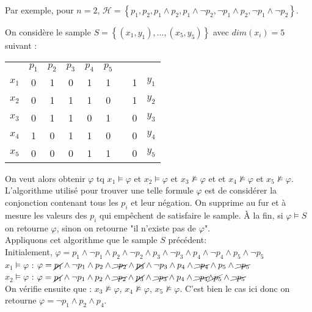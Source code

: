 \documentclass{article}
\begin{document}
    Par exemple, pour $n=2$, $\mathcal{H} = \left\{p_1, p_2, p_1 \wedge p_2,
    p_1 \wedge \neg p_2, \neg p_1 \wedge p_2, \neg p_1 \wedge \neg p_2 \right\}$.

    On considère le sample $S = \left\{(x_1,y_1),\dots,(x_5,y_5) \right\}$ avec
    $dim(x_i)=5$ suivant :

    \begin{center}
        \begin{tabular}{c c c c c c c c c}
        & $p_1$ & $p_2$ & $p_3$ & $p_4$ & $p_5$ &&&\\
        $x_1$ & 0 & 1 & 0 & 1 & 1 && 1 & $y_1$ \\
        $x_2$ & 0 & 1 & 1 & 1 & 0 && 1 & $y_2$ \\
        $x_3$ & 0 & 1 & 1 & 0 & 1 && 0 & $y_3$ \\
        $x_4$ & 1 & 0 & 1 & 1 & 0 && 0 & $y_4$ \\
        $x_5$ & 0 & 0 & 0 & 1 & 1 && 0 & $y_5$ \\
        \end{tabular}
    \end{center}

    On veut alors obtenir $\varphi$ tq $x_1 \models \varphi$ et $x_2 \models \varphi$ et $x_3 \not\models \varphi$ et et $x_4 \not\models \varphi$ et $x_5 \not\models \varphi$. L'algorithme utilisé pour trouver une telle formule
    $\varphi$ est de considérer la conjonction contenant tous les $p_i$ et
    leur négation. On supprime au fur et à mesure les valeurs des $p_i$ qui
    empêchent de satisfaire le sample. \`A la fin, si $\varphi \models S$ on
    retourne $\varphi$, sinon on retourne "il n'existe pas de $\varphi$".
    \\

    Appliquons cet algorithme que le sample $S$ précédent: \\
    Initialement, $\varphi = p_1 \wedge \neg p_1 \wedge p_2 \wedge \neg p_2 \wedge p_3 \wedge \neg p_3 \wedge p_4 \wedge \neg p_4 \wedge p_5 \wedge \neg p_5$\\
    $x_1 \models \varphi$ : $\varphi = \cancel{p_1} \wedge \neg p_1 \wedge p_2 \wedge \cancel{\neg p_2} \wedge \cancel{p_3} \wedge \neg p_3 \wedge p_4 \wedge \cancel{\neg p_4} \wedge p_5 \wedge \cancel{\neg p_5}$\\
    $x_2 \models \varphi$ : $\varphi = \cancel{p_1} \wedge \neg p_1 \wedge p_2 \wedge \cancel{\neg p_2} \wedge \cancel{p_3} \wedge \cancel{\neg p_3} \wedge p_4 \wedge \cancel{\neg p_4} \cancel{\wedge p_5} \wedge \cancel{\neg p_5}$\\
    On vérifie ensuite que : $x_3 \not\models \varphi$, $x_4 \not\models \varphi$,
    $x_5 \not\models \varphi$. C'est bien le cas ici donc on retourne $\varphi = \neg p_1 \wedge p_2 \wedge p_4$.\\
\end{document}
